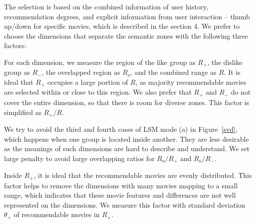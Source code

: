 \documentclass{vgtc}                          %
\begin{document}
The selection is based on the combined information of user history, recommendation degrees, and explicit information from user interaction -- thumb up/down for specific movies, which is described in the section 4.
We prefer to choose the dimensions that separate the semantic zones with the following three factors:
\begin{description}[style=unboxed,leftmargin=0cm]
\vspace{-2mm}
\item[Group sizes.] 
For each dimension, we measure the region of the like group as $R_+$, the dislike group as $R_-$, the overlapped region as $R_{o}$, and the combined range as $R$.
It is ideal that $R_+$ occupies a large portion of $R$, as majority recommendable movies are selected within or close to this region.
We also prefer that $R_+$ and $R_-$ do not cover the entire dimension, so that there is room for diverse zones.
This factor is simplified as $R_+ / R$.
\vspace{-2mm}
\item[The overlapping region.]
We try to avoid the third and fourth cases of LSM mode (a) in Figure~\ref{svd}, which happens when one group is located inside another.
They are less desirable as the meanings of such dimensions are hard to describe and understand.
We set large penalty to avoid large overlapping ratios for $R_o / R_+$ and $R_o / R_-$. 
\vspace{-2mm}
\item[The distribution of recommendable movies.]
Inside $R_+$, it is ideal that the recommendable movies are evenly distributed. %
This factor helps to remove the dimensions with many movies mapping to a small range, which indicates that these movie features and differences are not well represented on the dimensions.
We measure this factor with standard deviation $\theta_+$ of recommendable movies in $R_+$.
\end{description}
\end{document}
